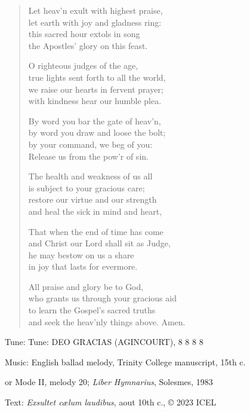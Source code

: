\hymn

\begin{verse}
Let heav’n exult with highest praise,\\
let earth with joy and gladness ring:\\
this sacred hour extols in song\\
the Apostles’ glory on this feast.

O righteous judges of the age,\\
true lights sent forth to all the world,\\
we raise our hearts in fervent prayer;\\
with kindness hear our humble plea.

By word you bar the gate of heav’n,\\
by word you draw and loose the bolt;\\
by your command, we beg of you:\\
Release us from the pow’r of sin.

The health and weakness of us all\\
is subject to your gracious care;\\
restore our virtue and our strength\\
and heal the sick in mind and heart,

That when the end of time has come\\
and Christ our Lord shall sit as Judge,\\
he may bestow on us a share\\
in joy that lasts for evermore.

All praise and glory be to God,\\
who grants us through your gracious aid\\
to learn the Gospel’s sacred truths\\
and seek the heav’nly things above. Amen.
\end{verse}

\begin{hymnsource}
Tune: Tune: DEO GRACIAS (AGINCOURT), 8 8 8 8

Music: English ballad melody, Trinity College manuscript, 15th c.

or Mode II, melody 20; \emph{Liber Hymnarius}, Solesmes, 1983

Text: \emph{Exsultet cælum laudibus}, aout 10th c., © 2023 ICEL
\end{hymnsource}
